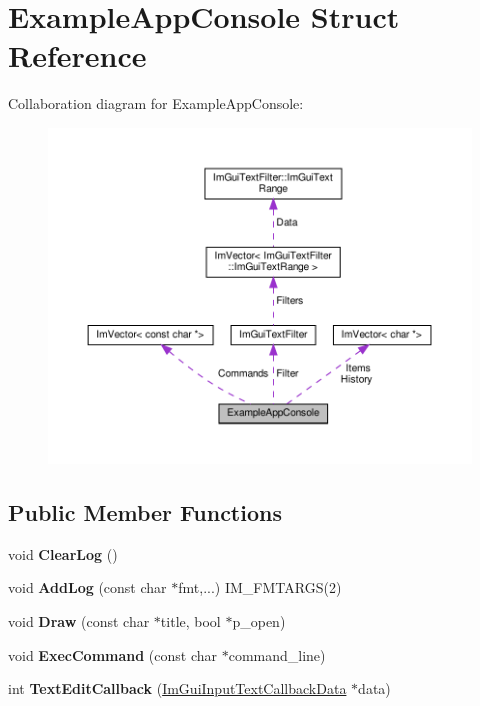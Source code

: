 \hypertarget{structExampleAppConsole}{}\section{Example\+App\+Console Struct Reference}
\label{structExampleAppConsole}


Collaboration diagram for Example\+App\+Console\+:\nopagebreak
\begin{figure}[H]
\begin{center}
\leavevmode
\includegraphics[width=350pt]{structExampleAppConsole__coll__graph}
\end{center}
\end{figure}
\subsection*{Public Member Functions}
\begin{DoxyCompactItemize}
\item 
\mbox{\label{structExampleAppConsole_a2ef13f00c474b16b8da2ec062d5e5cc2}} 
void {\bfseries Clear\+Log} ()
\item 
\mbox{\label{structExampleAppConsole_a719354ce6be7481923a5fd702e785952}} 
void {\bfseries Add\+Log} (const char $\ast$fmt,...) I\+M\+\_\+\+F\+M\+T\+A\+R\+GS(2)
\item 
\mbox{\label{structExampleAppConsole_a0518a09c7e8648dd52c7c06df19ac17a}} 
void {\bfseries Draw} (const char $\ast$title, bool $\ast$p\+\_\+open)
\item 
\mbox{\label{structExampleAppConsole_aa1e8bf1f3795cbc41597e1ff081c6589}} 
void {\bfseries Exec\+Command} (const char $\ast$command\+\_\+line)
\item 
\mbox{\label{structExampleAppConsole_a0bc85c5dd2bef56ae1a64697be00ec87}} 
int {\bfseries Text\+Edit\+Callback} (\hyperlink{structImGuiInputTextCallbackData}{Im\+Gui\+Input\+Text\+Callback\+Data} $\ast$data)
\end{DoxyCompactItemize}
